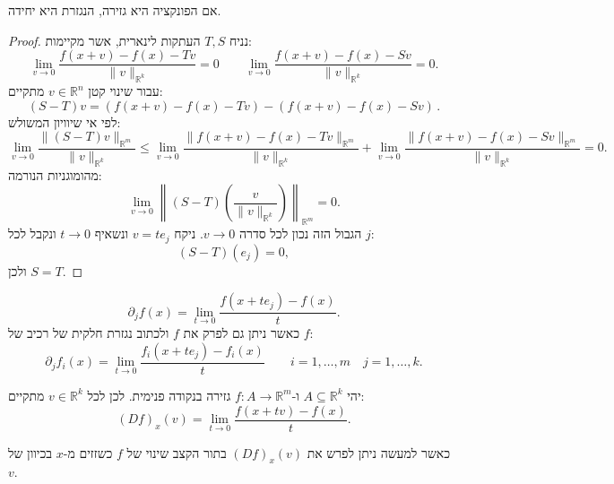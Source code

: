 \documentclass{tstextbook}
\begin{document}
\begin{proposition}
אם הפונקציה היא גזירה, הנגזרת היא יחידה.

\end{proposition}
\begin{proof}
נניח \(T,S\) העתקות לינארית, אשר מקיימות:
$$\operatorname*{lim}_{v\to0}{\frac{f(x+v)-f(x)-Tv}{\|v\|_{\mathbb{R}^{k}}}}=0\qquad\operatorname*{lim}_{v\to0}{\frac{f(x+v)-f(x)-Sv}{\|v\|_{\mathbb{R}^{k}}}}=0.$$
עבור שינוי קטן \(v\in \mathbb{R}^n\) מתקיים:
$$(S-T) v =(f(x+ v )-f(x)-T v )-(f(x+ v )-f(x)-S v )\,.$$
לפי אי שיוויון המשולש:
$$\operatorname*{lim}_{ v \to0}{\frac{\|(S-T) v \|_{\mathbb{R}^{m}}}{\| v \|_{\mathbb{R}^{k}}}}\leq\operatorname*{lim}_{ v \to0}{\frac{\|f(x+ v )-f(x)-T v \|_{\mathbb{R}^{m}}}{\| v \|_{\mathbb{R}^{k}}}}+\operatorname*{lim}_{ v \to0}{\frac{\|f(x+ v )-f(x)-S v \|_{\mathbb{R}^{m}}}{\| v \|_{\mathbb{R}^{k}}}}=0.$$
מהומוגניות הנורמה:
$$\operatorname*{lim}_{ v \to0}\left\|\left(S-T\right)\left({\frac{ v }{\| v \|_{\mathbb{R}^{k}}}}\right)\right\|_{\mathbb{R}^{m}}=0.$$
הגבול הזה נכון לכל סדרה \(v\to 0\). ניקח \(v=te_{j}\) ונשאיף \(t\to 0\) ונקבל לכל \(j\):
$$(S-T)(e_{j})=0,$$
ולכן \(S=T\).

\end{proof}
\begin{definition}
$$\partial_{j}f(x)=\operatorname*{lim}_{t\rightarrow0}{\frac{f(x+t e_{j})-f(x)}{t}}.$$
כאשר ניתן גם לפרק את \(f\) ולכתוב נגזרת חלקית של רכיב של \(f\):
$$\partial_{j}f_{i}(x)=\operatorname*{lim}_{t\rightarrow0}{\frac{f_{i}(x+t e_{j})-f_{i}(x)}{t}}\qquad i=1,\ldots,m\quad j=1,\ldots,k.$$

\end{definition}
\begin{proposition}
יהי \(A\subseteq \mathbb{R}^k\) ו-\(f:A\to\mathbb{R}^m\) גזירה בנקודה פנימית. לכן לכל \(v\in \mathbb{R}^k\) מתקיים:
$$(D f)_{x}( v )=\operatorname*{lim}_{t\rightarrow0}{\frac{f(x+t v )-f(x)}{t}}.$$

\end{proposition}
כאשר למעשה ניתן לפרש את \((Df)_{x}(v)\) בתור הקצב שינוי של \(f\) כשזזים מ-\(x\) בכיוון של \(v\).
\end{document}
